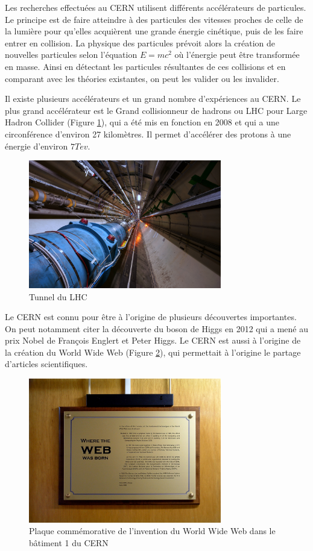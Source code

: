 \documentclass[a4paper,11pt]{report}
\begin{document}
Les recherches effectuées au CERN utilisent différents accélérateurs de particules.
Le principe est de faire atteindre à des particules des vitesses proches de celle de la lumière pour qu'elles acquièrent une grande énergie cinétique, puis de les faire entrer en collision.
La physique des particules prévoit alors la création de nouvelles particules selon l'équation $E=mc^2$ où l'énergie peut être transformée en masse.
Ainsi en détectant les particules résultantes de ces collisions et en comparant avec les théories existantes, on peut les valider ou les invalider.

Il existe plusieurs accélérateurs et un grand nombre d'expériences au CERN.
Le plus grand accélérateur est le Grand collisionneur de hadrons ou LHC pour Large Hadron Collider (Figure \ref{LHC}), qui a été mis en fonction en 2008 et qui a une circonférence d'environ 27 kilomètres.
Il permet d'accélérer des protons à une énergie d'environ $7 Tev$.

\begin{figure}[!htb]
    \includegraphics[width=0.75\textwidth, center]{LHC.jpg}
    \caption{Tunnel du LHC}
    \label{LHC}
\end{figure}

Le CERN est connu pour être à l'origine de plusieurs découvertes importantes.
On peut notamment citer la découverte du boson de Higgs en 2012 qui a mené au prix Nobel de François Englert et Peter Higgs.
Le CERN est aussi à l'origine de la création du World Wide Web (Figure \ref{WEB}), qui permettait à l'origine le partage d'articles scientifiques.

\begin{figure}[!htb]
    \includegraphics[width=0.75\textwidth, center]{WEB.jpg}
    \caption{Plaque commémorative de l'invention du World Wide Web dans le bâtiment 1 du CERN}
    \label{WEB}
\end{figure}
\end{document}

